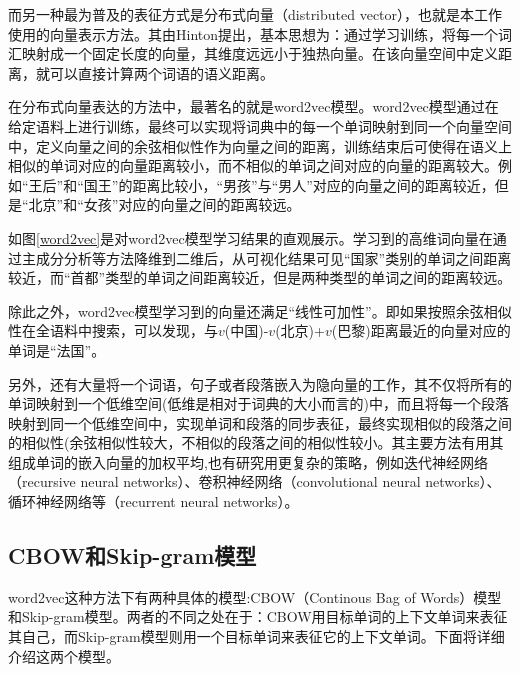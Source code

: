 而另一种最为普及的表征方式是分布式向量（distributed vector），也就是本工作使用的向量表示方法。其由Hinton提出，基本思想为：通过学习训练，将每一个词汇映射成一个固定长度的向量，其维度远远小于独热向量。在该向量空间中定义距离，就可以直接计算两个词语的语义距离。

在分布式向量表达的方法中，最著名的就是word2vec模型。word2vec模型通过在给定语料上进行训练，最终可以实现将词典中的每一个单词映射到同一个向量空间中，定义向量之间的余弦相似性作为向量之间的距离，训练结束后可使得在语义上相似的单词对应的向量距离较小，而不相似的单词之间对应的向量的距离较大。例如“王后”和“国王”的距离比较小，“男孩”与“男人”对应的向量之间的距离较近，但是“北京”和“女孩”对应的向量之间的距离较远。

如图\ref{word2vec}是对word2vec模型学习结果的直观展示。学习到的高维词向量在通过主成分分析等方法降维到二维后，从可视化结果可见“国家”类别的单词之间距离较近，而“首都”类型的单词之间距离较近，但是两种类型的单词之间的距离较远。

除此之外，word2vec模型学习到的向量还满足“线性可加性”。即如果按照余弦相似性在全语料中搜索，可以发现，与$v$(中国)-$v$(北京)+$v$(巴黎)距离最近的向量对应的单词是“法国”。

另外，还有大量将一个词语，句子或者段落嵌入为隐向量的工作，其不仅将所有的单词映射到一个低维空间(低维是相对于词典的大小而言的)中，而且将每一个段落映射到同一个低维空间中，实现单词和段落的同步表征，最终实现相似的段落之间的相似性(余弦相似性较大，不相似的段落之间的相似性较小。其主要方法有用其组成单词的嵌入向量的加权平均,也有研究用更复杂的策略，例如迭代神经网络（recursive neural networks）、卷积神经网络（convolutional neural networks）、循环神经网络等（recurrent neural networks）。

\subsection{CBOW和Skip-gram模型}

word2vec这种方法下有两种具体的模型:CBOW（Continous Bag of Words）模型和Skip-gram模型。两者的不同之处在于：CBOW用目标单词的上下文单词来表征其自己，而Skip-gram模型则用一个目标单词来表征它的上下文单词。下面将详细介绍这两个模型。

